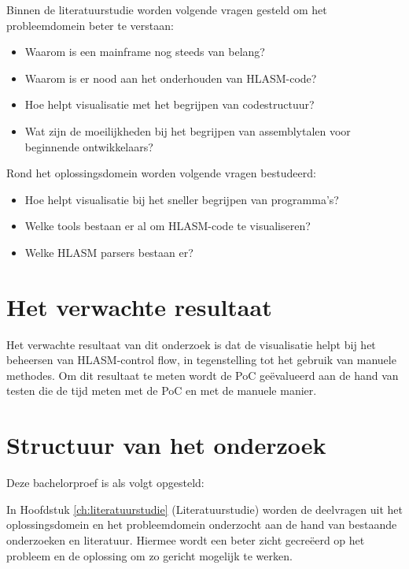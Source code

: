 \newpage

Binnen de literatuurstudie worden volgende vragen gesteld om het probleemdomein beter te verstaan:  

\begin{itemize}
    \item Waarom is een mainframe nog steeds van belang? 
    \item Waarom is er nood aan het onderhouden van HLASM-code?
    \item Hoe helpt visualisatie met het begrijpen van codestructuur? 
    \item Wat zijn de moeilijkheden bij het begrijpen van assemblytalen voor beginnende ontwikkelaars?
\end{itemize}

Rond het oplossingsdomein worden volgende vragen bestudeerd:

\begin{itemize}
    \item Hoe helpt visualisatie bij het sneller begrijpen van programma's?
    \item Welke tools bestaan er al om HLASM-code te visualiseren?
    \item Welke HLASM parsers bestaan er?
\end{itemize}

\section{Het verwachte resultaat}
\label{sec:resultaat}

Het verwachte resultaat van dit onderzoek is dat de visualisatie helpt bij het beheersen van HLASM-control flow, in tegenstelling tot het gebruik van manuele methodes. Om dit resultaat te meten wordt de PoC geëvalueerd aan de hand van testen die de tijd meten met de PoC en met de manuele manier.

\section{Structuur van het onderzoek}
\label{sec:structuur}

Deze bachelorproef is als volgt opgesteld: 

In Hoofdstuk \ref{ch:literatuurstudie} (Literatuurstudie) worden de deelvragen uit het oplossingsdomein en het probleemdomein onderzocht aan de hand van bestaande onderzoeken en literatuur. Hiermee wordt een beter zicht gecreëerd op het probleem en de oplossing om zo gericht mogelijk te werken. 

